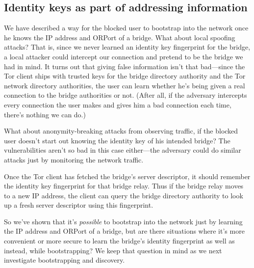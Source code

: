 \documentclass{llncs}
\begin{document}

\subsection{Identity keys as part of addressing information}
\label{subsec:id-address}

We have described a way for the blocked user to bootstrap into the
network once he knows the IP address and ORPort of a bridge. What about
local spoofing attacks? That is, since we never learned an identity
key fingerprint for the bridge, a local attacker could intercept our
connection and pretend to be the bridge we had in mind. It turns out
that giving false information isn't that bad---since the Tor client
ships with trusted keys for the bridge directory authority and the Tor
network directory authorities, the user can learn whether he's being
given a real connection to the bridge authorities or not. (After all,
if the adversary intercepts every connection the user makes and gives
him a bad connection each time, there's nothing we can do.)

What about anonymity-breaking attacks from observing traffic, if the
blocked user doesn't start out knowing the identity key of his intended
bridge? The vulnerabilities aren't so bad in this case either---the
adversary could do similar attacks just by monitoring the network
traffic.

Once the Tor client has fetched the bridge's server descriptor, it should
remember the identity key fingerprint for that bridge relay. Thus if
the bridge relay moves to a new IP address, the client can query the
bridge directory authority to look up a fresh server descriptor using
this fingerprint.

So we've shown that it's \emph{possible} to bootstrap into the network
just by learning the IP address and ORPort of a bridge, but are there
situations where it's more convenient or more secure to learn the bridge's
identity fingerprint as well as instead, while bootstrapping? We keep
that question in mind as we next investigate bootstrapping and discovery.
\end{document}
